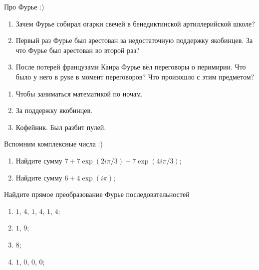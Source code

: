 \begin{problem}
  Про Фурье :)
  \begin{enumerate}
    \item Зачем Фурье собирал огарки свечей в бенедиктинской артиллерийской школе?
    \item Первый раз Фурье был арестован за недостаточную поддержку якобинцев. За что Фурье был арестован во второй раз?
    \item После потерей французами Каира Фурье вёл переговоры о перимирии. Что было у него в руке в момент переговоров? 
    Что произошло с этим предметом?
  \end{enumerate}
  \begin{sol}
    \begin{enumerate}
      \item Чтобы заниматься математикой по ночам.
      \item За поддержку якобинцев.
      \item Кофейник. Был разбит пулей.
    \end{enumerate}
\end{sol}
\end{problem}


\begin{problem}
  Вспомним комплексные числа :)
  \begin{enumerate}
    \item Найдите сумму $7 + 7 \exp(2i\pi/3) + 7 \exp(4i\pi/3)$;
    \item Найдите сумму $6 + 4\exp(i\pi)$;
  \end{enumerate}

  \begin{sol}
  \end{sol}
\end{problem}


\begin{problem}
Найдите прямое преобразование Фурье последовательностей
\begin{enumerate}
  \item $1$, $4$, $1$, $4$, $1$, $4$;
  \item $1$, $9$;
  \item $8$;
  \item $1$, $0$, $0$, $0$;
\end{enumerate}
  \begin{sol}
  \end{sol}
\end{problem}

